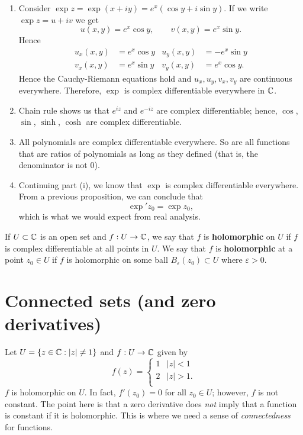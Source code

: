 \begin{example}
    \begin{enumerate}
        \item Consider $\exp{z} = \exp{(x + iy)} = e^x(\cos{y} + i \sin{y})$. If we write $\exp{z} = u + iv$ we get
            \[ u(x, y) = e^x\cos{y}, \qquad v(x, y) = e^x\sin{y}. \]
            Hence
            \begin{align*}
                u_x(x, y) &= e^x\cos{y} & u_y(x, y) &= -e^x\sin{y} \\
                v_x(x, y) &= e^x\sin{y} & v_y(x, y) &= e^x\cos{y}.
            \end{align*}
            Hence the Cauchy-Riemann equations hold and $u_x, u_y, v_x, v_y$ are continuous everywhere. Therefore, $\exp$ is complex differentiable everywhere in $\mathbb{C}$.

        \item Chain rule shows us that $e^{iz}$ and $e^{-iz}$ are complex differentiable; hence, $\cos$, $\sin$, $\sinh$, $\cosh$ are complex differentiable.

        \item All polynomials are complex differentiable everywhere. So are all functions that are ratios of polynomials as long as they defined (that is, the denominator is not 0).

        \item Continuing part (i), we know that $\exp$ is complex differentiable everywhere. From a previous proposition, we can conclude that
            \[ \exp'{z_0} = \exp{z_0}, \]
            which is what we would expect from real analysis. 
    \end{enumerate}
\end{example}

\begin{definition}[Holomorphic]
    If $U \subset \mathbb{C}$ is an open set and $f: U \to \mathbb{C}$, we say that $f$ is \textbf{holomorphic} on $U$ if $f$ is complex differentiable at all points in $U$. We say that $f$ is \textbf{holomorphic} at a point $z_0 \in U$ if $f$ is holomorphic on some ball $B_\varepsilon(z_0) \subset U$ where $\varepsilon > 0$.
\end{definition}

\section{Connected sets (and zero derivatives)}

\begin{example}
    Let $U = \{ z \in \mathbb{C}: \lvert z \rvert \neq 1\}$ and $f: U \to \mathbb{C}$ given by
    \[ 
        f(z) =
        \begin{cases}
            1 & \lvert z \rvert < 1 \\
            2 & \lvert z \rvert > 1. \\
        \end{cases} 
    \]
    $f$ is holomorphic on $U$. In fact, $f'(z_0) = 0$ for all $z_0 \in U$; however, $f$ is not constant. The point here is that a zero derivative does \emph{not} imply that a function is constant if it is holomorphic. This is where we need a sense of \emph{connectedness} for functions.
\end{example}

